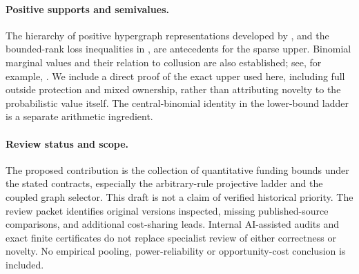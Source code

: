 \documentclass[11pt]{article}
\theoremstyle{definition}\newtheorem{definition}[theorem]{Definition}
\theoremstyle{remark}\newtheorem{remark}[theorem]{Remark}
\begin{document}
\paragraph{Positive supports and semivalues.}
The hierarchy of positive hypergraph representations developed by
\citet{FeigeEtAl2014}, and the bounded-rank loss inequalities in
\citet{EzraEtAl2018}, are antecedents for the sparse upper.
Binomial marginal values and their relation to collusion are also established;
see, for example, \citet{Casajus2011}. We include a direct proof of the exact
upper used here, including full outside protection and mixed ownership, rather
than attributing novelty to the probabilistic value itself. The central-binomial
identity in the lower-bound ladder is a separate arithmetic ingredient.

\paragraph{Review status and scope.}
The proposed contribution is the collection of quantitative funding bounds
under the stated contracts, especially the arbitrary-rule projective ladder and the coupled graph selector.
This draft is not a claim of verified historical priority. The review packet
identifies original versions inspected, missing published-source comparisons,
and additional cost-sharing leads. Internal AI-assisted audits and exact
finite certificates do not replace specialist review of either correctness or
novelty. No empirical pooling, power-reliability or opportunity-cost conclusion
is included.
\end{document}
